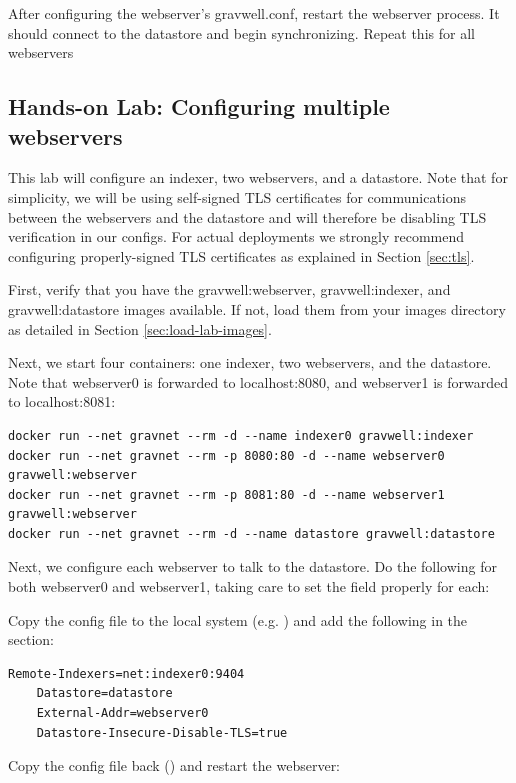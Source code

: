After configuring the webserver's gravwell.conf, restart the webserver
process. It should connect to the datastore and begin synchronizing.
Repeat this for all webservers

\subsection{Hands-on Lab: Configuring multiple webservers}

This lab will configure an indexer, two webservers, and a datastore. Note that for
simplicity, we will be using self-signed TLS certificates for communications between
the webservers and the datastore and will therefore be disabling TLS verification in
our configs. For actual deployments we strongly recommend configuring properly-signed
TLS certificates as explained in Section \ref{sec:tls}.

First, verify that you have the gravwell:webserver, gravwell:indexer, and gravwell:datastore
images available. If not, load them from your images directory as detailed in
Section \ref{sec:load-lab-images}.

Next, we start four containers: one indexer, two webservers, and the
datastore. Note that webserver0 is forwarded to localhost:8080, and
webserver1 is forwarded to localhost:8081:

\begin{Verbatim}[breaklines=true]
docker run --net gravnet --rm -d --name indexer0 gravwell:indexer
docker run --net gravnet --rm -p 8080:80 -d --name webserver0 gravwell:webserver
docker run --net gravnet --rm -p 8081:80 -d --name webserver1 gravwell:webserver
docker run --net gravnet --rm -d --name datastore gravwell:datastore
\end{Verbatim}

Next, we configure each webserver to talk to the datastore. Do the
following for both webserver0 and webserver1, taking care to set the
 field properly for each:

Copy the config file to the local system
(e.g. )
and add the following in the \code{[Global]} section:

\begin{Verbatim}[breaklines=true]
    Remote-Indexers=net:indexer0:9404
    Datastore=datastore
    External-Addr=webserver0
    Datastore-Insecure-Disable-TLS=true
\end{Verbatim}

Copy the config file back ()
and restart the webserver:

